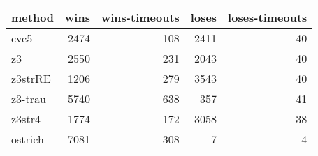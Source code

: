 \begin{tabular}{lrrrr}
\hline
 method   &   wins &   wins-timeouts &   loses &   loses-timeouts \\
\hline
 cvc5     &   2474 &             108 &    2411 &               40 \\
 z3       &   2550 &             231 &    2043 &               40 \\
 z3strRE  &   1206 &             279 &    3543 &               40 \\
 z3-trau  &   5740 &             638 &     357 &               41 \\
 z3str4   &   1774 &             172 &    3058 &               38 \\
 ostrich  &   7081 &             308 &       7 &                4 \\
\hline
\end{tabular}
